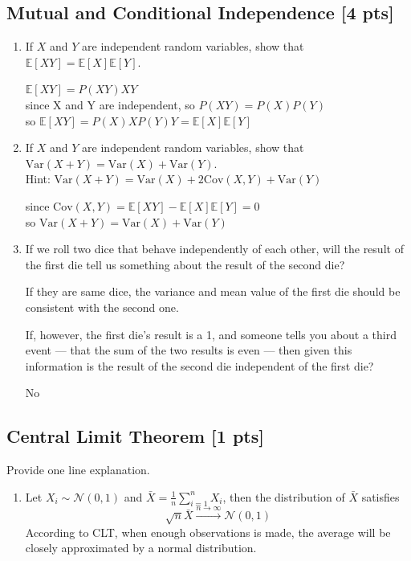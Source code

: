 \documentclass[a4paper]{article}
\theoremstyle{definition}
\newcommand{\Var}{\mathrm{Var}}
\newcommand{\Cov}{\mathrm{Cov}}
\newenvironment{soln}{
    \leavevmode\color{blue}\ignorespaces
}{}
\begin{document}
\subsection{Mutual and Conditional Independence [4 pts]}
\begin{enumerate}
\item If $X$ and $Y$ are independent random variables, show that
  $\mathbb{E}[XY] = \mathbb{E}[X]\mathbb{E}[Y]$.
  
  \begin{soln}  $\mathbb{E}[XY] = {P(XY)}{X}{Y}$ \\ since X and Y are independent, so $P(XY) = P(X)P(Y)$\\ so $\mathbb{E}[XY] = {P(X)X}{P(Y)Y} = \mathbb{E}[X]\mathbb{E}[Y]$ \end{soln}
  
\item If $X$ and $Y$ are independent random variables, show that
  $\Var(X+Y) = \Var(X) + \Var(Y)$. \\
  Hint: $\Var(X+Y) = \Var(X) + 2\Cov(X, Y) + \Var(Y)$
  
  \begin{soln}  since $\Cov(X, Y) = \mathbb{E}[XY] - \mathbb{E}[X]\mathbb{E}[Y] = 0$ \\ so $\Var(X+Y) = \Var(X) + \Var(Y)$ \end{soln}
 
\item If we roll two dice that behave independently of each
  other, will the result of the first die tell us something about the
  result of the second die? 
  
  \begin{soln}  If they are same dice, the variance and mean value of the first die should be consistent with the second one. \end{soln}
  
  If, however, the first die's result is a 1,
  and someone tells you about a third event --- that the sum of the two
  results is even --- then given this information is the result of the second die
  independent of the first die? 
  
  \begin{soln}  No \end{soln}
\end{enumerate}

\subsection{Central Limit Theorem [1 pts]}
Provide one line explanation.
\begin{enumerate}
\item Let $X_i\sim\mathcal{N}(0, 1)$ and $\bar{X} = \frac{1}{n}\sum_{i=1}^n X_i$, then the distribution of $\bar{X}$ satisfies 
  $$\sqrt{n}\bar{X}\overset{n\rightarrow\infty}{\longrightarrow}\mathcal{N}(0, 1)$$
  \begin{soln}  According to CLT, when enough observations is made, the average will be closely approximated by a normal distribution. \end{soln}
  
\end{enumerate}
\end{document}
